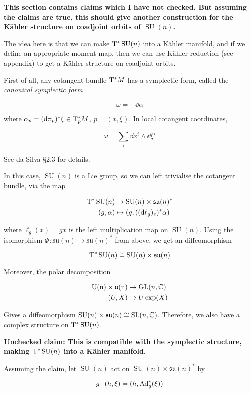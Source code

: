 \documentclass{article}
\DeclareMathOperator{\SU}{SU}
\newcommand{\su}{\mathfrak{su}}
\begin{document}
\textbf{This section contains claims which I have not checked. But assuming the claims are true, this should give another construction for the K\"ahler structure on coadjoint orbits of \(\SU(n)\).}

The idea here is that we can make \(\T^*\SU(n)\) into a K\"ahler manifold, and if we define an appropriate moment map, then we can use K\"ahler reduction (see appendix) to get a K\"ahler structure on coadjoint orbits.

First of all, any cotangent bundle \(\mathrm{T}^*M\) has a symplectic form, called the \emph{canonical symplectic form}

\[\omega = -\dd\alpha\]

where \(\alpha_p = (\dd\pi_p)^*\xi \in \mathrm{T}_p^*M\), \(p = (x, \xi)\). In local cotangent coordinates,

\[\omega = \sum_i \dd x^i \wedge \dd \xi^i\]

See da Silva \S 2.3 for details.

In this case, \(\SU(n)\) is a Lie group, so we can left trivialise the cotangent bundle, via the map

\begin{align*}
    \TT^*\SU(n) &\to \SU(n) \times \su(n)^* \\
    (g, \alpha) &\mapsto (g, ((\dd\ell_g)_e)^*\alpha) 
\end{align*}

where \(\ell_g(x) = gx\) is the left multiplication map on \(\SU(n)\). Using the isomorphism \(\Phi : \su(n) \to \su(n)^*\) from above, we get an diffeomorphism

\[\T^* \SU(n) \cong \SU(n)\times \su(n)\]

Moreover, the polar decomposition

\begin{align*}
    \rm U(n) \times \mathfrak{u}(n) &\to \operatorname{GL}(n, \mathbb{C}) \\
    (U, X) &\mapsto U \exp(X)
\end{align*}

Gives a diffeomorphism \(\SU(n) \times \su(n) \cong \SL(n, \C)\). Therefore, we also have a complex structure on \(\T^*\SU(n)\). 

\textbf{Unchecked claim: This is compatible with the symplectic structure, making \(\T^*\SU(n)\) into a K\"ahler manifold.}

Assuming the claim, let \(\SU(n)\) act on \(\SU(n) \times \su(n)^*\) by

\[g \cdot (h, \xi) = (h, \operatorname{Ad}_g^*(\xi))\]
\end{document}
